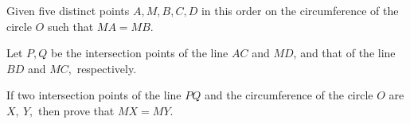 Given five distinct points $A,M,B,C,D$ in this order on the circumference of the circle $O$ such that $MA=MB.$

Let $P,Q$ be the intersection points of the line $AC$ and $MD$, and that of the line $BD$ and $MC,$ respectively.

If two intersection points of the line $PQ$ and the circumference of the circle $O$ are $X,\ Y,$ then prove that $MX=MY.$